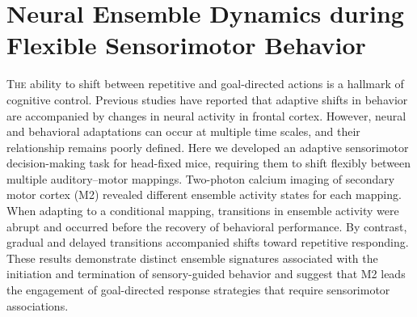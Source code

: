 \chapter{Neural Ensemble Dynamics during Flexible Sensorimotor Behavior}


\lettrine[lines=3]{T}{he} ability to shift between repetitive and goal-directed actions is a hallmark of cognitive control. Previous studies have reported that adaptive shifts in behavior are accompanied by changes in neural activity in frontal cortex. However, neural and behavioral adaptations can occur at multiple time scales, and their relationship remains poorly defined. Here we developed an adaptive sensorimotor decision-making task for head-fixed mice, requiring them to shift flexibly between multiple auditory–motor mappings. Two-photon calcium imaging of secondary motor cortex (M2) revealed different ensemble activity states for each mapping. When adapting to a conditional mapping, transitions in ensemble activity were abrupt and occurred before the recovery of behavioral performance. By contrast, gradual and delayed transitions accompanied shifts toward repetitive responding. These results demonstrate distinct ensemble signatures associated with the initiation and termination of sensory-guided behavior and suggest that M2 leads the engagement of goal-directed response strategies that require sensorimotor associations.
\newpage












